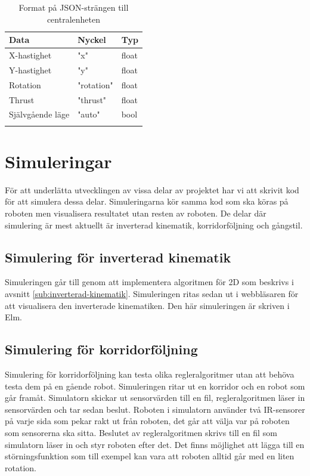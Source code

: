 \documentclass[a4paper,titlepage,12pt]{article}
\begin{document}
	\begin{longtable}[c]{l l l }
        \textbf{Data} & \textbf{Nyckel} & \textbf{Typ} \\ \midrule
        X-hastighet & "x" & float \\
        Y-hastighet & "y" & float \\
        Rotation & "rotation" & float \\
        Thrust & "thrust" & float \\
        Självgående läge & "auto" & bool \\

		\caption{Format på JSON-strängen till
        centralenheten\label{table:guimessagestocentral}}
	\end{longtable}
    

    \newpage
	\section{Simuleringar}
	För att underlätta utvecklingen av vissa delar av projektet har vi att
    skrivit kod för att simulera dessa delar. Simuleringarna kör samma kod som
    ska köras på roboten men visualisera resultatet utan resten av roboten. De
    delar där simulering är mest aktuellt är inverterad kinematik,
    korridorföljning och gångstil.

	\subsection{Simulering för inverterad kinematik}
	Simuleringen går till genom att implementera algoritmen för 2D som beskrivs
    i avsnitt \ref{sub:inverterad-kinematik}. Simuleringen ritas sedan ut i
    webbläsaren för att visualisera den inverterade kinematiken. Den här
    simuleringen är skriven i Elm.
	
	\subsection{Simulering för korridorföljning}
	Simulering för korridorföljning kan testa olika regleralgoritmer utan att
    behöva testa dem på en gående robot. Simuleringen ritar ut en korridor och
    en robot som går framåt. Simulatorn skickar ut sensorvärden till en fil,
    regleralgoritmen läser in sensorvärden och tar sedan beslut. Roboten i
    simulatorn använder två IR-sensorer på varje sida som pekar rakt ut från
    roboten, det går att välja var på roboten som sensorerna ska sitta. Beslutet
    av regleralgoritmen skrivs till en fil som simulatorn läser in och styr
    roboten efter det. Det finns möjlighet att lägga till en störningsfunktion
    som till exempel kan vara att roboten alltid går med en liten rotation.
	
\end{document}
